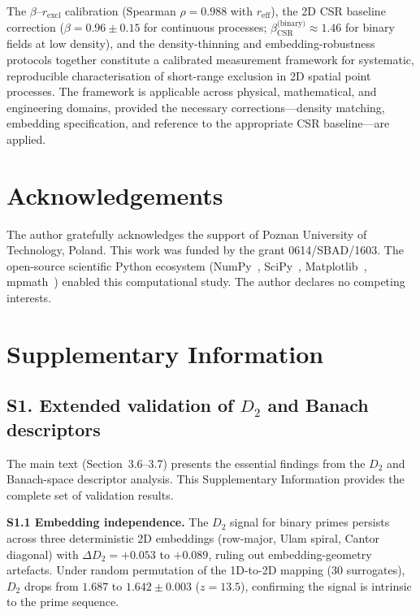\documentclass[final,1p,times]{elsarticle}
\theoremstyle{definition}
\begin{document}
The $\beta$--$r_{\text{excl}}$ calibration (Spearman $\rho=0.988$ with
$r_{\text{eff}}$), the 2D CSR baseline correction
($\beta=0.96\pm0.15$ for continuous processes;
$\beta_{\text{CSR}}^{\text{(binary)}}\approx1.46$ for binary fields
at low density), and the density-thinning and embedding-robustness
protocols together constitute a calibrated measurement framework for
systematic, reproducible characterisation of short-range exclusion in
2D spatial point processes. The framework is applicable across
physical, mathematical, and engineering domains, provided the
necessary corrections---density matching, embedding specification,
and reference to the appropriate CSR baseline---are applied.

\section*{Acknowledgements}
The author gratefully acknowledges the support of Poznan University
of Technology, Poland. This work was funded by the grant
0614/SBAD/1603. The open-source scientific Python ecosystem
(NumPy~\cite{HARRIS-2020}, SciPy~\cite{VIRTANEN-2020},
Matplotlib~\cite{HUNTER-2007}, mpmath~\cite{MPMATH}) enabled
this computational study. The author declares no competing interests.

\section*{Supplementary Information}

\subsection*{S1. Extended validation of $D_2$ and Banach descriptors}

The main text (Section~3.6--3.7) presents the essential findings from
the $D_2$ and Banach-space descriptor analysis. This Supplementary
Information provides the complete set of validation results.

\textbf{S1.1 Embedding independence.} The $D_2$ signal for binary primes
persists across three deterministic 2D embeddings (row-major, Ulam spiral,
Cantor diagonal) with $\Delta D_2 = +0.053$ to $+0.089$, ruling out
embedding-geometry artefacts. Under random permutation of the 1D-to-2D
mapping (30 surrogates), $D_2$ drops from $1.687$ to $1.642 \pm 0.003$
($z = 13.5$), confirming the signal is intrinsic to the prime sequence.
\end{document}
